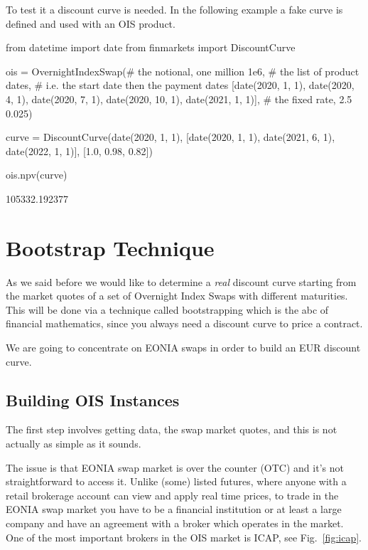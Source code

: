To test it a discount curve is needed. In the following example a fake curve is defined and used with an OIS product.

\begin{ipython}
from datetime import date
from finmarkets import DiscountCurve

ois = OvernightIndexSwap(# the notional, one million
                         1e6,
                         # the list of product dates,
                         # i.e. the start date then the payment dates
                         [date(2020, 1, 1), date(2020, 4, 1),
                          date(2020, 7, 1), date(2020, 10, 1),
                          date(2021, 1, 1)],
                         # the fixed rate, 2.5%
                         0.025)

curve = DiscountCurve(date(2020, 1, 1),
                      [date(2020, 1, 1), date(2021, 6, 1),
                       date(2022, 1, 1)],
                      [1.0, 0.98, 0.82])

ois.npv(curve)
\end{ipython}
\begin{ioutput}
105332.192377
\end{ioutput}

\section{Bootstrap Technique}\label{bootstrapping-technique}

As we said before we would like to determine a \emph{real} discount
curve starting from the market quotes of a set of Overnight Index Swaps with different maturities. This will be done via a technique called bootstrapping which is the abc of financial mathematics, since you always need a discount curve to price a contract.

We are going to concentrate on EONIA swaps in order to build an EUR discount curve.

\subsection{Building OIS Instances}
\label{building-ois-instances}

The first step involves getting data, the swap market quotes, and this is not actually as simple as it sounds.

The issue is that EONIA swap market is over the counter (OTC) and it's not straightforward to access it. Unlike (some) listed futures, where anyone with a retail brokerage account can view and apply real time prices, to trade in the EONIA swap market you have to be a financial institution or at least a large company and have an agreement with a broker which operates in the market. One of the most important brokers in the OIS market is ICAP, see Fig.~\ref{fig:icap}.

